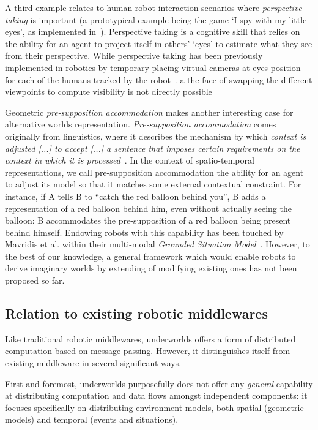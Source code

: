 \documentclass[letterpaper, 10 pt, conference]{ieeeconf}  %
\newcommand{\etal}{et al.\xspace}
\newcommand{\uwds}{{\sc underworlds}\xspace}
\begin{document}
A third example relates to human-robot interaction scenarios where \emph{perspective
taking} is important (a prototypical example being the game `I spy with my
little eyes', as implemented in~\cite{ros2010which}). Perspective taking is a
cognitive skill that relies on the ability for an agent to project itself in
others' `eyes' to estimate what they see from their perspective. While
perspective taking has been previously implemented in robotics by temporary placing
virtual cameras at eyes position for each of the humans tracked by the
robot~\cite{ros2010solving}. a the face of  swapping the different viewpoints
to compute visibility is not directly possible

Geometric \emph{pre-supposition accommodation} makes another interesting case
for alternative worlds representation. \emph{Pre-supposition accommodation}
comes originally from linguistics, where it describes the mechanism by which
\emph{context is adjusted [...] to accept [...] a sentence that imposes certain
requirements on the context in which it is
processed}~\cite{vonfintel2008presupposition}. In the context of spatio-temporal
representations, we call pre-supposition accommodation the ability for an agent
to adjust its model so that it matches some external contextual constraint. For
instance, if A tells B to ``catch the red balloon behind you'', B adds a
representation of a red balloon behind him, even without actually seeing the
balloon: B accommodates the pre-supposition of a red balloon being present
behind himself. Endowing robots with this capability has been touched by
Mavridis \etal within their multi-modal \emph{Grounded Situation
Model}~\cite{Mavridis2006}. However, to the best of our knowledge, a general
framework which would enable robots to derive imaginary worlds by extending of
modifying existing ones has not been proposed so far.




\subsection{Relation to existing robotic middlewares}

Like traditional robotic middlewares, \uwds offers a form of distributed
computation based on message passing. However, it distinguishes itself from
existing middleware in several significant ways.

First and foremost, \uwds purposefully does not offer any \emph{general}
capability at distributing computation and data flows amongst independent
components: it focuses specifically on distributing environment models, both
spatial (geometric models) and temporal (events and situations).
\end{document}
